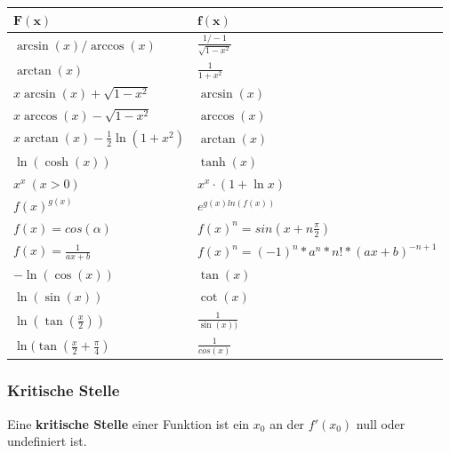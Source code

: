 \documentclass[8pt]{extarticle}
\begin{document}
\begin{multicols*}{3}
\begin{center}
\begin{tabularx}{\linewidth}{c>{\centering\arraybackslash}Xc}
  \end{tabularx}
\end{center}

\begin{center}
  \begin{tabularx}{\linewidth}{>{\centering\arraybackslash}X>{\centering\arraybackslash}X}
  
  $\mathbf{F(x)}$ & $\mathbf{f(x)}$ \\
  \midrule
  $\arcsin(x) / \arccos(x)$ & $\frac{1 / -1}{\sqrt{1 - x^2}}$ \\
  $\arctan(x)$ & $\frac{1}{1 + x^2}$ \\ 

  $x\arcsin(x) + \sqrt{1 - x^2}$ & $\arcsin(x)$\\
  $x\arccos(x) - \sqrt{1 - x^2}$ & $\arccos(x)$\\
  $x\arctan(x) - \frac{1}{2}\ln(1+x^2)$ & $\arctan(x)$\\
  $\ln(\cosh(x))$ & $\tanh(x)$\\

   
  $x^x \ (x > 0)$ & $x^x \cdot (1 + \ln{x})$ \\
$f(x)^{g(x)}$ & $e^{g(x) ln(f(x))}$\\
$f(x) = cos(\alpha)$ & $f(x)^n = sin(x + n\frac{\pi}{2})$\\
$f(x) = \frac{1}{ax + b}$ & $f(x)^n = (-1)^n * a^n * n! * (ax + b)^{-n+1}$\\
  $-\ln(\cos(x))$ & $\tan(x)$\\
  $\ln(\sin(x))$ & $\cot(x)$\\
  $\ln(\tan(\frac{x}{2}))$ & $\frac{1}{\sin(x))}$\\
  $\ln{(\tan(\frac{x}{2} + \frac{\pi}{4})}$ & $\frac{1}{cos(x)}$\\

  \bottomrule
  \end{tabularx}
\end{center}

    \subsubsection {Kritische Stelle}
  Eine \textbf{kritische Stelle} einer Funktion ist ein $x_0$ an der $f'(x_0)$ null
  oder undefiniert ist.


\end{multicols*}
\end{document}
